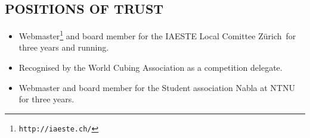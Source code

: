 \documentclass[line,margin]{res}
\newcommand{\zh}{Z\"{u}rich}
\begin{document}
\begin{resume}
\section{POSITIONS OF TRUST}
    \begin{itemize}
        \item Webmaster\footnote{{\tt http://iaeste.ch/}} and board member for
            the IAESTE Local Comittee \zh\ for three years and running.
        \item Recognised by the World Cubing Association as a competition
            delegate.
        \item Webmaster and board member for the Student association Nabla at
            NTNU for three years.
    \end{itemize}


\end{resume}
\end{document}
